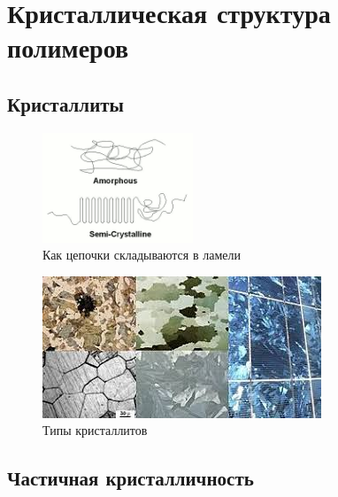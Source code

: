 \section{Кристаллическая структура полимеров}
\subsection{Кристаллиты}

	\begin{figure} 
\vspace{-20pt}
  \begin{center}
    \includegraphics[width=0.4\textwidth]{fig/crystal-1.png}
    \caption{Как цепочки складываются в ламели}
    \label{fig:crystal-1}
  \end{center}
  \vspace{-20pt}
  \vspace{1pt}
\end{figure}



\begin{figure}
    \includegraphics[width=\textwidth]{fig/crystallites.jpg}
    \caption{Типы кристаллитов}
    \label{fig:crystallites}
\end{figure}



\subsection{Частичная кристалличность}

